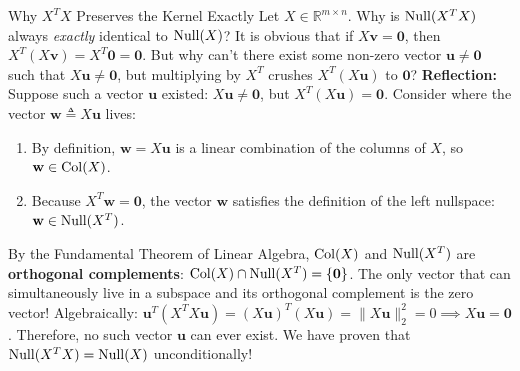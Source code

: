 \begin{ponderbox}{Why $X^T X$ Preserves the Kernel Exactly}
Let $X \in \mathbb{R}^{m \times n}$. Why is $\operatorname{Null}(X^T X)$ always \emph{exactly} identical to $\operatorname{Null}(X)$?
It is obvious that if $X\mathbf{v} = \mathbf{0}$, then $X^T (X\mathbf{v}) = X^T \mathbf{0} = \mathbf{0}$. But why can't there exist some non-zero vector $\mathbf{u} \ne \mathbf{0}$ such that $X\mathbf{u} \ne \mathbf{0}$, but multiplying by $X^T$ crushes $X^T(X\mathbf{u})$ to $\mathbf{0}$?
\tcblower
\textbf{Reflection:} Suppose such a vector $\mathbf{u}$ existed: $X\mathbf{u} \ne \mathbf{0}$, but $X^T (X\mathbf{u}) = \mathbf{0}$.
Consider where the vector $\mathbf{w} \triangleq X\mathbf{u}$ lives:
\begin{enumerate}
    \item By definition, $\mathbf{w} = X\mathbf{u}$ is a linear combination of the columns of $X$, so $\mathbf{w} \in \operatorname{Col}(X)$.
    \item Because $X^T \mathbf{w} = \mathbf{0}$, the vector $\mathbf{w}$ satisfies the definition of the left nullspace: $\mathbf{w} \in \operatorname{Null}(X^T)$.
\end{enumerate}
By the Fundamental Theorem of Linear Algebra, $\operatorname{Col}(X)$ and $\operatorname{Null}(X^T)$ are \textbf{orthogonal complements}: $\operatorname{Col}(X) \cap \operatorname{Null}(X^T) = \{\mathbf{0}\}$.
The only vector that can simultaneously live in a subspace and its orthogonal complement is the zero vector!
Algebraically: $\mathbf{u}^T (X^T X \mathbf{u}) = (X\mathbf{u})^T (X\mathbf{u}) = \|X\mathbf{u}\|_2^2 = 0 \implies X\mathbf{u} = \mathbf{0}$.
Therefore, no such vector $\mathbf{u}$ can ever exist. We have proven that $\operatorname{Null}(X^T X) = \operatorname{Null}(X)$ unconditionally!
\end{ponderbox}


